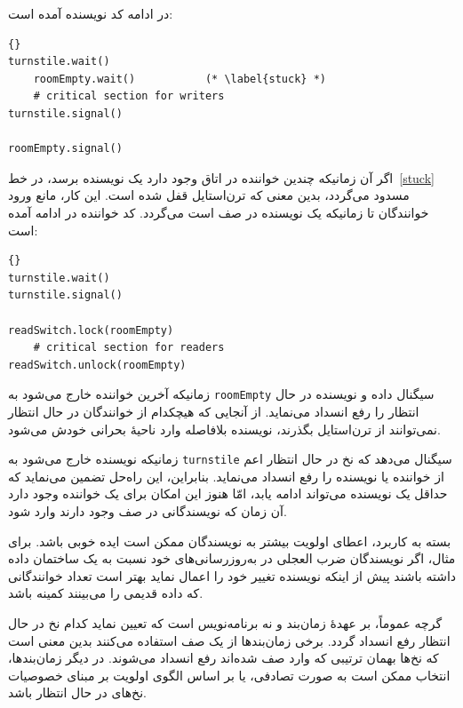 \documentclass{book}
\begin{document}
    در ادامه کد نویسنده آمده است:

\begin{latin}
\begin{lstlisting}[title=\rl{راه‌حل نویسنده بدون قحطی}]{}
turnstile.wait()
    roomEmpty.wait()           (* \label{stuck} *)
    # critical section for writers
turnstile.signal()

roomEmpty.signal()
\end{lstlisting}
\end{latin}

    اگر آن زمانیکه چندین خواننده در اتاق وجود دارد یک نویسنده برسد، در خط~\ref{stuck} مسدود می‌گردد، بدین معنی که ترن‌استایل قفل شده است. 
    این کار، مانع ورود خوانندگان تا زمانیکه یک نویسنده در صف است می‌گردد. کد خواننده در ادامه آمده است: 

\begin{latin}
\begin{lstlisting}[title=\rl{راه‌حل خواننده بدون قحطی}]{}
turnstile.wait()
turnstile.signal()

readSwitch.lock(roomEmpty)
    # critical section for readers
readSwitch.unlock(roomEmpty)
\end{lstlisting}
\end{latin}

    زمانیکه آخرین خواننده خارج می‌شود به {\tt roomEmpty} سیگنال داده و نویسنده در حال انتظار را رفع انسداد می‌نماید. 
    از آنجایی که هیچکدام از خوانندگان در حال انتظار نمی‌توانند از ترن‌استایل بگذرند، نویسنده بلافاصله وارد ناحیهٔ بحرانی خودش می‌شود. 

    زمانیکه نویسنده خارج می‌شود  به {\tt turnstile} سیگنال می‌دهد که نخ‌ در حال انتظار اعم از خواننده یا نویسنده را رفع انسداد می‌نماید. 
    بنابراین، این راه‌حل تضمین می‌نماید که حداقل یک نویسنده می‌تواند ادامه یابد، امّا هنوز این امکان برای یک خواننده وجود دارد آن زمان که 
    نویسندگانی در صف وجود دارند وارد شود. 
    
    بسته به کاربرد، اعطای اولویت بیشتر به نویسندگان ممکن است ایده خوبی باشد. برای مثال، اگر نویسندگان ضرب العجلی در به‌روزرسانی‌های خود 
    نسبت به یک ساختمان داده‌ داشته باشند 
    پیش از اینکه نویسنده تغییر خود را اعمال نماید بهتر است تعداد خوانندگانی که داده قدیمی را می‌بینند کمینه باشد. 

    گرچه عموماً، بر عهدهٔ زمان‌بند و نه برنامه‌نویس است که تعیین نماید کدام نخ در حال انتظار رفع انسداد گردد. 
    برخی زمان‌بندها از یک صف  استفاده می‌کنند بدین معنی است که نخ‌ها بهمان ترتیبی که 
    وارد صف شده‌اند رفع انسداد می‌شوند. در دیگر زمان‌بندها، انتخاب ممکن است به صورت تصادفی، یا بر اساس الگوی اولویت  
    بر مبنای خصوصیات نخ‌های در حال انتظار باشد. 
\end{document}
